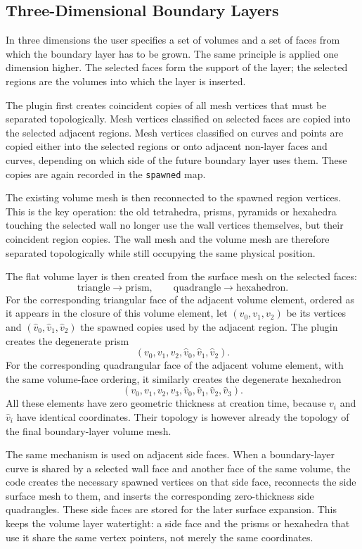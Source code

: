 \documentclass[11pt]{article}
\begin{document}
\subsection{Three-Dimensional Boundary Layers}

In three dimensions the user specifies a set of volumes and a set of faces from
which the boundary layer has to be grown. The same principle is applied one
dimension higher. The selected faces form the support of the layer; the selected
regions are the volumes into which the layer is inserted.

The plugin first creates coincident copies of all mesh vertices that must be
separated topologically. Mesh vertices classified on selected faces are copied
into the selected adjacent regions. Mesh vertices classified on curves and
points are copied either into the selected regions or onto adjacent non-layer
faces and curves, depending on which side of the future boundary layer uses
them. These copies are again recorded in the \texttt{spawned} map.

The existing volume mesh is then reconnected to the spawned region vertices.
This is the key operation: the old tetrahedra, prisms, pyramids or hexahedra
touching the selected wall no longer use the wall vertices themselves, but their
coincident region copies. The wall mesh and the volume mesh are therefore
separated topologically while still occupying the same physical position.

The flat volume layer is then created from the surface mesh on the selected
faces:
\[
  \text{triangle} \longrightarrow \text{prism}, \qquad
  \text{quadrangle} \longrightarrow \text{hexahedron}.
\]
For the corresponding triangular face of the adjacent volume element, ordered
as it appears in the closure of this volume element, let
\((v_0,v_1,v_2)\) be its vertices and
\((\hat v_0,\hat v_1,\hat v_2)\) the spawned copies used by the adjacent
region. The plugin creates the degenerate prism
\[
  (v_0,v_1,v_2,\hat v_0,\hat v_1,\hat v_2).
\]
For the corresponding quadrangular face of the adjacent volume element, with
the same volume-face ordering, it similarly creates the degenerate hexahedron
\[
  (v_0,v_1,v_2,v_3,\hat v_0,\hat v_1,\hat v_2,\hat v_3).
\]
All these elements have zero geometric thickness at creation time, because
\(v_i\) and \(\hat v_i\) have identical coordinates. Their topology is however
already the topology of the final boundary-layer volume mesh.

The same mechanism is used on adjacent side faces. When a boundary-layer curve
is shared by a selected wall face and another face of the same volume, the code
creates the necessary spawned vertices on that side face, reconnects the side
surface mesh to them, and inserts the corresponding zero-thickness side
quadrangles. These side faces are stored for the later surface expansion. This
keeps the volume layer watertight: a side face and the prisms or hexahedra that
use it share the same vertex pointers, not merely the same coordinates.
\end{document}
